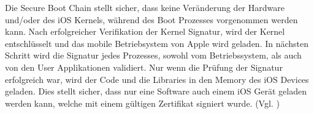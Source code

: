Die Secure Boot Chain stellt sicher, dass keine Veränderung der Hardware und/oder des iOS Kernels, während des Boot Prozesses vorgenommen werden kann. Nach erfolgreicher Verifikation der Kernel Signatur, wird der Kernel entschlüsselt und das mobile Betriebsystem von Apple wird geladen. In nächsten Schritt wird die Signatur jedes Prozesses, sowohl vom Betriebssystem, als auch von den User Applikationen validiert. Nur wenn die Prüfung der Signatur erfolgreich war, wird der Code und die Libraries in den Memory des iOS Devices geladen. Dies stellt sicher, dass nur eine Software auch einem iOS Gerät geladen werden kann, welche mit einem gültigen Zertifikat signiert wurde. (Vgl. \cite{Apple[4], Apple[5], Apple[6]})

%
%
%
%


